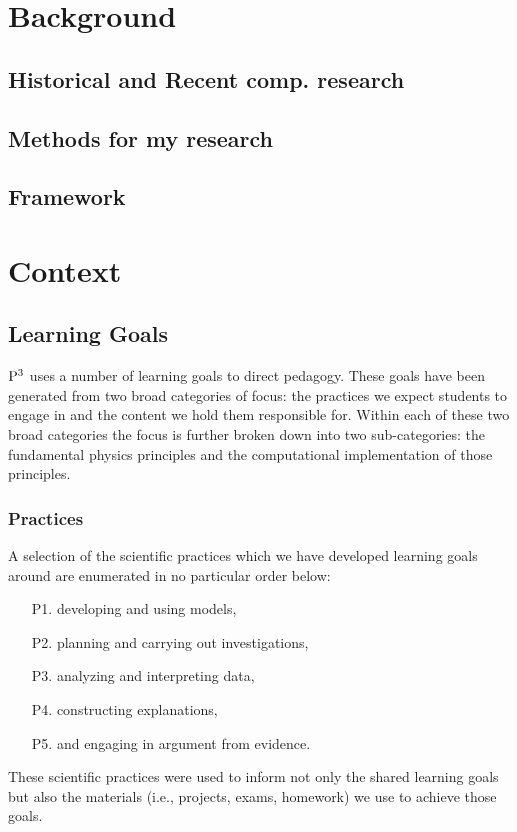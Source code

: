 \documentclass{msuphddissertation}
\begin{document}
\begin{doublespace}
%
%

\chapter{Background} %
\section{Historical and Recent comp. research}
\section{Methods for my research}
\section{Framework}

%
%

\chapter{Context}
\section{Learning Goals}\label{sec:goals}

${\rm P}^{3}$ uses a number of learning goals to direct pedagogy.  These goals have been generated from two broad categories of focus: the practices we expect students to engage in and the content we hold them responsible for.  Within each of these two broad categories the focus is further broken down into two sub-categories: the fundamental physics principles and the computational implementation of those principles.

\subsection{Practices}

A selection of the scientific practices which we have developed learning goals around are enumerated in no particular order below:  \begin{enumerate}
\item[P1.] developing and using models,
\item[P2.] planning and carrying out investigations,
\item[P3.] analyzing and interpreting data,
\item[P4.] constructing explanations,
\item[P5.] and engaging in argument from evidence.
\end{enumerate}  These scientific practices were used to inform not only the shared learning goals but also the materials (i.e., projects, exams, homework) we use to achieve those goals.


\end{doublespace}
\end{document}
